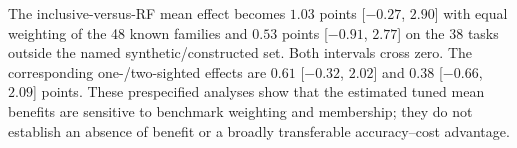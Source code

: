 The inclusive-versus-RF mean effect becomes $1.03$ points
[$-0.27$, $2.90$] with equal weighting of the 48 known families
and $0.53$ points [$-0.91$, $2.77$] on the 38 tasks outside the named
synthetic/constructed set. Both intervals cross zero. The corresponding one-/two-sighted
effects are $0.61$ [$-0.32$, $2.02$] and $0.38$ [$-0.66$, $2.09$]
points. These prespecified analyses show that the estimated tuned
mean benefits are sensitive to benchmark weighting and membership;
they do not establish an absence of benefit or a broadly transferable
accuracy--cost advantage.

